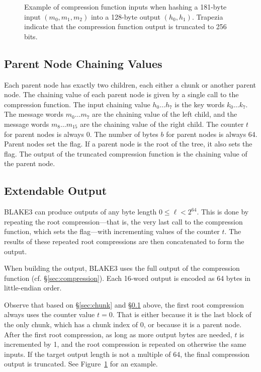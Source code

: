 \documentclass[11pt,notitlepage,a4paper]{article}
\newcommand{\flag}[1]{\texttt{\detokenize{#1}}\xspace}
\begin{document}
\begin{figure}
\centering

\caption{Example of compression function inputs when hashing a 181-byte input $(m_0, m_1, m_2)$ into a 128-byte output $(h_0, h_1)$. Trapezia indicate that the compression function output is truncated to 256 bits.}\label{fig:chunk}
\end{figure}

\subsection{Parent Node Chaining Values}\label{sec:parent}

Each parent node has exactly two children, each either a chunk or another
parent node. The chaining value of each parent node is given by a single call
to the compression function. The input chaining value $h_{0} \ldots h_{7}$ is
the key words $k_{0} \ldots k_{7}$. The message words $m_{0} \ldots m_{7}$ are
the chaining value of the left child, and the message words $m_{8} \ldots
m_{15}$ are the chaining value of the right child. The counter $t$ for parent
nodes is always 0. The number of bytes $b$ for parent nodes is always 64.
Parent nodes set the \flag{PARENT} flag. If a parent node is the root of the
tree, it also sets the \flag{ROOT} flag. The output of the truncated
compression function is the chaining value of the parent node.

\subsection{Extendable Output}\label{sec:extendable}

BLAKE3 can produce outputs of any byte length $0 \leq \ell < 2^{64}$. 
This is done by repeating the root compression---that is, the very last 
call to the compression function, which sets the \flag{ROOT} flag---with 
incrementing values of the counter $t$. The results of these repeated root 
compressions are then concatenated to form the output.

When building the output, BLAKE3 uses the full output of the
compression function (cf. \S\ref{sec:compression}). Each 16-word output is
encoded as 64 bytes in little-endian order.

Observe that based on \S\ref{sec:chunk} and \S\ref{sec:parent} above, the first
root compression always uses the counter value $t = 0$. That is either because
it is the last block of the only chunk, which has a chunk index of $0$, or
because it is a parent node. After the first root compression, as long as more
output bytes are needed, $t$ is incremented by 1, and the root compression is
repeated on otherwise the same inputs. If the target output length is not a
multiple of 64, the final compression output is truncated. See
Figure~\ref{fig:chunk} for an example.
\end{document}
